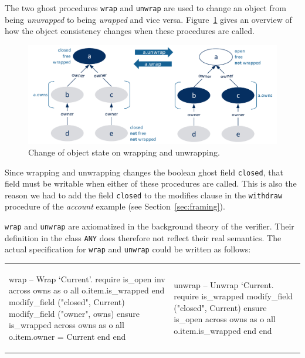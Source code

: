\documentclass[a4paper,12pt]{article}
\newcommand{\e}[1]{\mbox{\lstinline[language=Eiffel]|#1|}}
\begin{document}
The two ghost procedures \e{wrap} and \e{unwrap} are used to change an object from being \emph{unwrapped} to being \emph{wrapped} and vice versa. Figure~\ref{fig:objectconsistency} gives an overview of how the object consistency changes when these procedures are called. 

\begin{figure}[!htb]
\begin{center}
\includegraphics[width=\columnwidth]{objectconsistency.pdf}
\end{center}
\caption{Change of object state on wrapping and unwrapping.}
\label{fig:objectconsistency}
\end{figure}

Since wrapping and unwrapping changes the boolean ghost field \e{closed}, that field must be writable when either of these procedures are called. This is also the reason we had to add the field \e{closed} to the modifies clause in the \e{withdraw} procedure of the \emph{account} example (see Section~\ref{sec:framing}).

\e{wrap} and \e{unwrap} are axiomatized in the background theory of the verifier. Their definition in the class \e{ANY} does therefore not reflect their real semantics. The actual specification for \e{wrap} and \e{unwrap} could be written as follows:

\noindent\begin{tabular}{ll}
{\begin{erunning}[basicstyle=\scriptsize,numbers=left]
wrap
		-- Wrap `Current'.
	require
		is_open
		inv
		across owns as o all o.item.is_wrapped end
		modify_field ("closed", Current)
		modify_field ("owner", owns)
	ensure
		is_wrapped
		across owns as o all o.item.owner = Current end
	end
\end{erunning}}
&
\hspace{4mm}
{\begin{erunning}[basicstyle=\scriptsize,numbers=left,firstnumber=last]
unwrap
		-- Unwrap `Current.
	require
		is_wrapped
		modify_field ("closed", Current)
	ensure
		is_open
		across owns as o all 
		       o.item.is_wrapped end
	end
\end{erunning}}
\end{tabular}
\end{document}
